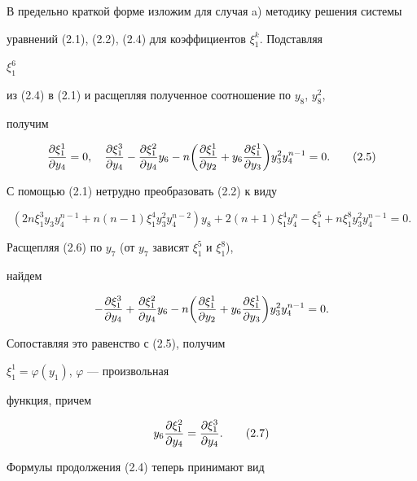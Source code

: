 В предельно краткой форме изложим для случая a) методику решения системы


уравнений (2.1), (2.2), (2.4) для коэффициентов $\xi^k_1$. Подставляя


$\xi^6_1$


из (2.4) в (2.1) и расщепляя полученное соотношение по $y_8$, $y^2_8$,


получим


\begin{equation}


\frac{\dk^1_1}{\dy_4}=0,\quad \frac{\dk^3_1}{\dy_4}-


\frac{\dk^2_1}{\dy_4}y_6-n\biggl(


\frac{\dk^1_1}{\dy_2}+y_6\frac{\dk^1_1}{\dy_3}\biggr)


y^2_3y^{n-1}_4=0. \tag{2.5}


\end{equation}


С помощью (2.1) нетрудно преобразовать (2.2) к виду


\begin{equation}


(2n\xi^3_1y_3y^{n-1}_4+n(n-1)\xi^4_1y^2_3y^{n-2}_4)y_8+


2(n+1)\xi^4_1y^n_4-\xi^5_1+n\xi^8_1y^2_3y^{n-1}_4=0. \tag{2.6}


\end{equation}


Расщепляя (2.6) по $y_7$ (от $y_7$ зависят $\xi^5_1$ и $\xi^8_1$),


найдем


$$


-\frac{\dk^3_1}{\dy_4}+\frac{\dk^2_1}{\dy_4}y_6-n\biggl(


\frac{\dk^1_1}{\dy_2}+y_6\frac{\dk^1_1}{\dy_3}\biggr)


y^2_3y^{n-1}_4=0.


$$


Сопоставляя это равенство с (2.5), получим


$\xi^1_1=\varphi(y_1)$, $\varphi$ --- произвольная


функция, причем


\begin{equation}


y_6\frac{\dk^2_1}{\dy_4}=\frac{\dk^3_1}{\dy_4}. \tag{2.7}


\end{equation}


Формулы продолжения (2.4) теперь принимают вид


